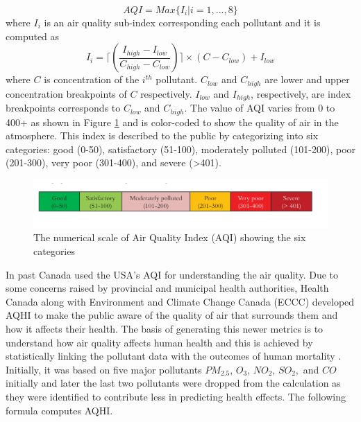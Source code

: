 \begin{equation}
AQI = Max \{I_i|i = 1, ..., 8\}
\end{equation}
where $I_i$ is an air quality sub-index corresponding each pollutant and it is computed as 
\begin{equation}
I_i = \lceil(\frac{I_{high} - I_{low}}{C_{high} - C_{low}})\rceil \times (C - C_{low}) + I_{low}
\end{equation}
where $C$ is concentration of the $i^{th}$ pollutant. $C_{low}$ and $C_{high}$ are lower and upper concentration breakpoints of $C$ respectively.
$I_{low}$ and $I_{high}$, respectively, are index breakpoints corresponds to $C_{low}$ and $C_{high}$.  The value of AQI varies from 0 to 400+ as shown in Figure \ref{aqi} and is color-coded to show the quality of air in the atmosphere. This index is described to the public by categorizing into six categories: good (0-50), satisfactory (51-100), moderately polluted (101-200), poor (201-300), very poor (301-400), and severe (>401).


\begin{figure}[h]
    \begin{center}
    \includegraphics[scale=0.58]{./images/figure13.png}
    \end{center}
   
    \caption{The numerical scale of Air Quality Index (AQI) showing the six categories \cite{AirQualityIndex}}
    
    \label{aqi}
\end{figure}

\hspace{1 cm}

In past Canada used the USA's AQI for understanding the air quality. Due to some concerns raised by provincial and municipal health authorities, Health Canada along with Environment and Climate Change Canada (ECCC) developed AQHI to make the public aware of the quality of air that surrounds them and how it affects their health. The basis of generating this newer metrics is to understand how air quality affects human health and this is achieved by statistically linking the pollutant data with the outcomes of human mortality \cite{hasselback2010air}. Initially, it was based on five major pollutants $PM_{2.5}$, $O_3$, $NO_2$, $SO_2,$ and $CO$ initially and later the last two pollutants were dropped from the calculation as they were identified to contribute less in predicting health effects. The following formula computes AQHI.





